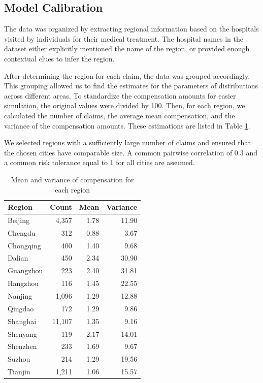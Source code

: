 \documentclass[fleqn,mnsc,nonblindrev]{informs4}
\begin{document}
\subsection{Model Calibration}\label{app:health_simul}
The data was organized by extracting regional information based on the hospitals visited by individuals for their medical treatment. The hospital names in the dataset either explicitly mentioned the name of the region, or provided enough contextual clues to infer the region. 

After determining the region for each claim, the data was grouped accordingly. This grouping allowed us to find the estimates for the parameters of distributions across different areas. To standardize the compensation amounts for easier simulation, the original values were divided by 100. Then, for each region, we calculated the number of claims, the average mean compensation, and the variance of the compensation amounts. These estimations are listed in Table \ref{tab:region_summary}. 

We selected regions with a sufficiently large number of claims and ensured that the chosen cities have comparable size. A common pairwise correlation of 0.3 and a common risk tolerance equal to 1 for all cities are assumed.

\begin{table}[t]
\centering
\caption{Mean and variance of compensation for each region}
\begin{tabular}{lrrr}
\toprule\toprule
Region & Count & Mean & Variance \\
\midrule
Beijing & 4,357 & 1.78 & 11.90 \\
Chengdu & 312 & 0.88 & 3.67 \\
Chongqing & 400 & 1.40 & 9.68 \\
Dalian & 450 & 2.34 & 30.90 \\
Guangzhou & 223 & 2.40 & 31.81 \\
Hangzhou & 116 & 1.45 & 22.55 \\
Nanjing & 1,096 & 1.29 & 12.88 \\
Qingdao & 172 & 1.29 & 9.86 \\
Shanghai & 11,107 & 1.35 & 9.16 \\
Shenyang & 119 & 2.17 & 14.01 \\
Shenzhen & 233 & 1.69 & 9.67 \\
Suzhou & 214 & 1.29 & 19.56 \\
Tianjin & 1,211 & 1.06 & 15.57 \\
\bottomrule\bottomrule
\end{tabular}
\label{tab:region_summary}
\end{table}
\end{document}
